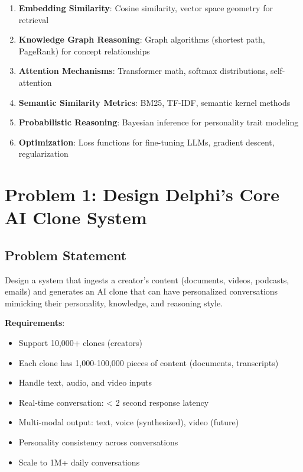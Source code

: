 \documentclass[10pt]{article}
\begin{document}
\begin{enumerate}[leftmargin=*]
    \item \textbf{Embedding Similarity}: Cosine similarity, vector space geometry for retrieval
    \item \textbf{Knowledge Graph Reasoning}: Graph algorithms (shortest path, PageRank) for concept relationships
    \item \textbf{Attention Mechanisms}: Transformer math, softmax distributions, self-attention
    \item \textbf{Semantic Similarity Metrics}: BM25, TF-IDF, semantic kernel methods
    \item \textbf{Probabilistic Reasoning}: Bayesian inference for personality trait modeling
    \item \textbf{Optimization}: Loss functions for fine-tuning LLMs, gradient descent, regularization
\end{enumerate}

\section{Problem 1: Design Delphi's Core AI Clone System}

\subsection{Problem Statement}

Design a system that ingests a creator's content (documents, videos, podcasts, emails) and generates an AI clone that can have personalized conversations mimicking their personality, knowledge, and reasoning style.

\textbf{Requirements}:
\begin{itemize}[leftmargin=*]
    \item Support 10,000+ clones (creators)
    \item Each clone has 1,000-100,000 pieces of content (documents, transcripts)
    \item Handle text, audio, and video inputs
    \item Real-time conversation: < 2 second response latency
    \item Multi-modal output: text, voice (synthesized), video (future)
    \item Personality consistency across conversations
    \item Scale to 1M+ daily conversations
\end{itemize}
\end{document}
